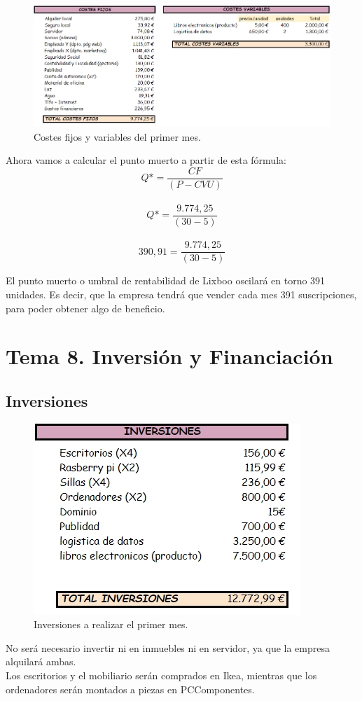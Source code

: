 \documentclass[openany,overnay,a4paper, twoside, 12pt]{book}
\begin{document}
\begin{figure}[h]
\includegraphics[scale = 0.55]{CostesFVBUENO.png}
\centering\renewcommand{\thefigure}{}
\newpage
\caption{Costes fijos y variables del primer mes.}
\end{figure}
Ahora vamos a calcular el punto muerto a partir de esta fórmula: 
\\\[ Q*= \frac{CF}{(P-CVU)}\]
\\\[ Q*= \frac{9.774,25}{(30-5)}\]
\\\[390,91 = \frac{9.774,25}{(30-5)}\]

El punto muerto o umbral de rentabilidad de Lixboo oscilará en torno 391 unidades. Es decir, que la empresa tendrá que vender cada mes 391 suscripciones, para poder obtener algo de beneficio.
\newpage

\setcounter{chapter}{8} %
\chapter*{Tema 8. Inversión y Financiación}
\setcounter{section}{0}
\section{Inversiones}
\begin{figure}[h]

\includegraphics[scale = 0.8]{inversiones.png}
\centering
\caption{Inversiones a realizar el primer mes.}


\end{figure}
No será necesario invertir ni en inmuebles ni en servidor, ya que la empresa alquilará ambas.\\Los escritorios y el mobiliario serán comprados en Ikea, mientras que los ordenadores serán montados a piezas en PCComponentes.
\newpage
\end{document}
